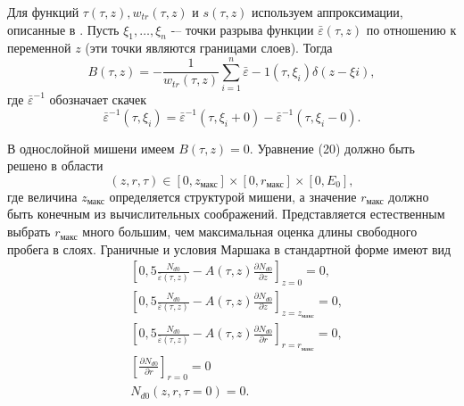 Для функций \( \tau (\tau , z ), w_{tr}(\tau , z)\) и \(s(\tau,z)\) используем аппроксимации, описанные в \cite{smolar3}.
Пусть \(\xi_1,\ldots,\xi_n\) -– точки разрыва функции \(\bar{\varepsilon}(\tau , z)\) по отношению к переменной \( z \) (эти точки являются границами слоев). Тогда
\begin{equation}
B(\tau, z) = −\frac{1}{w_{tr}(\tau, z)}\sum_{i=1}^{n} \bar{\varepsilon} −1 (\tau ,\xi_i ) \delta ( z − \xi i ) ,    
\end{equation}
где \(\bar{\varepsilon}^{−1}\) обозначает скачек
\begin{equation}
    \bar{\varepsilon}^{−1} (\tau ,\xi_i ) = \bar{\varepsilon}^{−1} (\tau,\xi_i + 0 ) − \bar{\varepsilon}^{−1} (\tau ,\xi_i − 0 ).
\end{equation}

В однослойной мишени имеем \( B(\tau,z)=0 \).
Уравнение (20) должно быть решено в области
\begin{equation}
    (z, r,\tau) \in [0, z_\text{макс}]\times [0, r_\text{макс} ]\times[0, E_0],    
\end{equation}
где величина \( z_\text{макс} \) определяется структурой мишени, а значение \( r_\text{макс} \) должно быть
конечным из вычислительных соображений. Представляется естественным выбрать \( r_\text{макс} \)
много большим, чем максимальная оценка длины свободного пробега в слоях.
Граничные и условия Маршака в стандартной форме \cite{keiz} имеют вид
\begin{align}
& \left[0,5 \frac{N_{d0}}{\bar{\varepsilon}(\tau, z)} − A (\tau , z)\frac{\partial N_{d0}}{\partial z}\right]_{z=0} = 0 ,\\
& \left[0,5 \frac{N_{d0}}{\bar{\varepsilon}(\tau, z)} − A (\tau , z)\frac{\partial N_{d0}}{\partial z}\right]_{z=z_\text{макс}} = 0 ,\\
& \left[0,5 \frac{N_{d0}}{\bar{\varepsilon}(\tau, z)} − A (\tau , z)\frac{\partial N_{d0}}{\partial r}\right]_{r=r_\text{макс}} = 0,\\
& \left[\frac{\partial N_{d0}}{\partial r}\right]_{r=0} = 0\\
& N_{d0}(z, r, \tau=0 ) = 0.
\end{align}
